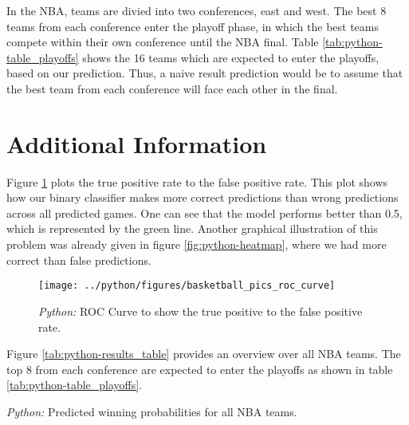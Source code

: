 \documentclass[11pt, a4paper, leqno]{article}
\begin{document}
In the NBA, teams are divied into two conferences, east and west. The best 8 teams from each conference enter the playoff phase, in which the best teams compete within their own conference until the NBA final.
Table \ref{tab:python-table_playoffs} shows the 16 teams which are expected to enter the playoffs, based on our prediction. Thus, a naive result prediction would be to assume that the best team from each conference will face each other in the final.
\clearpage
\section{Additional Information}

Figure \ref{fig:python-roc_curve} plots the true positive rate to the false positive rate. This plot shows how our binary classifier makes more correct predictions than wrong predictions across all predicted games. One can see that the model performs better than 0.5, which is represented by the green line. Another graphical illustration of this problem was already given in figure \ref{fig:python-heatmap}, where we had more correct than false predictions.

\begin{figure}[H]
   \centering
    \caption{\emph{Python:} ROC Curve to show the true positive to the false positive rate.}
    \texttt{[image: ../python/figures/basketball\_pics\_roc\_curve]}
    \label{fig:python-roc_curve}

\end{figure}
Figure \ref{tab:python-results_table} provides an overview over all NBA teams. The top 8 from each conference are expected to enter the playoffs as shown in table \ref{tab:python-table_playoffs}.
\begin{table}[H]

    \caption{\label{tab:python-results_table}\emph{Python:} Predicted winning probabilities for all NBA teams.}
    \begin{adjustbox}{width=\columnwidth,center}
    
\end{adjustbox}
\end{table}




\printbibliography
{}
\end{document}
